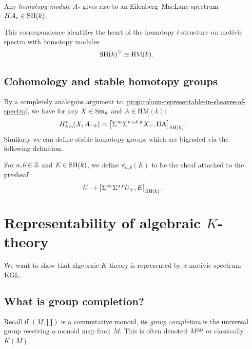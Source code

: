\documentclass[11pt,openany]{book}
\providecommand{\HM}{\mathrm{HM}}
\providecommand{\HA}{\mathrm{HA}}
\begin{document}
\begin{proposition} Any \textit{homotopy module} $A_\ast$ gives rise to an Eilenberg--MacLane spectrum $HA_\ast \in \mathrm{SH}(k)$.
\end{proposition}

This correspondence identifies the heart of the homotopy $t$-structure on motivic spectra with homotopy modules
\begin{align*}
    \SH(k)^\heart \simeq \HM(k).
\end{align*}
%

\subsection{Cohomology and stable homotopy groups}

By a completely analogous argument to \autoref{prop:cohom-representable-in-sheaves-of-spectra}, we have for any $X\in \mathrm{Sm}_k$ and $A \in \HM(k)$:
\begin{align*}
    H^n_\Nis(X, A_{-k}) &= \left[ \Sigma^\infty \Sigma^{n+k,k}X_+, \HA \right]_{\SH(k)}.
\end{align*}
%
Similarly we can define stable homotopy groups which are bigraded via the following definition.

\begin{definition} For $a,b\in \mathbb{Z}$ and $E \in \mathrm{SH}(k)$, we define $\pi_{a,b}(E)$ to be the sheaf attached to the presheaf
\begin{align*}
    U &\mapsto \left[ \Sigma^\infty \Sigma^{a,b} U_+, E \right]_{\mathrm{SH}(k)}.
\end{align*}
\end{definition}

\section{Representability of algebraic \texorpdfstring{$K$}{K}-theory}

\begin{goal} We want to show that algebraic $K$-theory is represented by a motivic spectrum $\mathrm{KGL}$.
\end{goal}

\subsection{What is group completion?}

Recall if $(M,\amalg)$ is a commutative monoid, its \textit{group completion} is the universal group receiving a monoid map from $M$. This is often denoted $M^{\mathrm{gp}}$ or classically $K(M)$.
\end{document}
